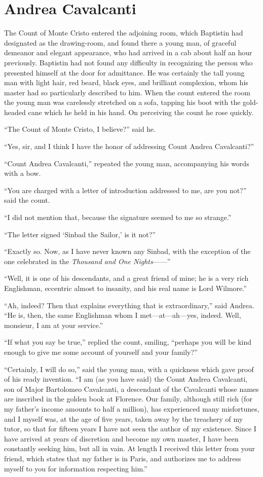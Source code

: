 \chapter{Andrea Cavalcanti}

The Count of Monte Cristo entered the adjoining room, which Baptistin
had designated as the drawing-room, and found there a young man, of
graceful demeanor and elegant appearance, who had arrived in a cab
about half an hour previously. Baptistin had not found any difficulty
in recognizing the person who presented himself at the door for
admittance. He was certainly the tall young man with light hair, red
beard, black eyes, and brilliant complexion, whom his master had so
particularly described to him. When the count entered the room the
young man was carelessly stretched on a sofa, tapping his boot with the
gold-headed cane which he held in his hand. On perceiving the count he
rose quickly.

“The Count of Monte Cristo, I believe?” said he.

“Yes, sir, and I think I have the honor of addressing Count Andrea
Cavalcanti?”

“Count Andrea Cavalcanti,” repeated the young man, accompanying his
words with a bow.

“You are charged with a letter of introduction addressed to me, are you
not?” said the count.

“I did not mention that, because the signature seemed to me so
strange.”

“The letter signed ‘Sinbad the Sailor,’ is it not?”

“Exactly so. Now, as I have never known any Sinbad, with the exception
of the one celebrated in the \textit{Thousand and One Nights}——”

“Well, it is one of his descendants, and a great friend of mine; he is
a very rich Englishman, eccentric almost to insanity, and his real name
is Lord Wilmore.”

“Ah, indeed? Then that explains everything that is extraordinary,” said
Andrea. “He is, then, the same Englishman whom I met—at—ah—yes, indeed.
Well, monsieur, I am at your service.”

“If what you say be true,” replied the count, smiling, “perhaps you
will be kind enough to give me some account of yourself and your
family?”

“Certainly, I will do so,” said the young man, with a quickness which
gave proof of his ready invention. “I am (as you have said) the Count
Andrea Cavalcanti, son of Major Bartolomeo Cavalcanti, a descendant of
the Cavalcanti whose names are inscribed in the golden book at
Florence. Our family, although still rich (for my father’s income
amounts to half a million), has experienced many misfortunes, and I
myself was, at the age of five years, taken away by the treachery of my
tutor, so that for fifteen years I have not seen the author of my
existence. Since I have arrived at years of discretion and become my
own master, I have been constantly seeking him, but all in vain. At
length I received this letter from your friend, which states that my
father is in Paris, and authorizes me to address myself to you for
information respecting him.”


